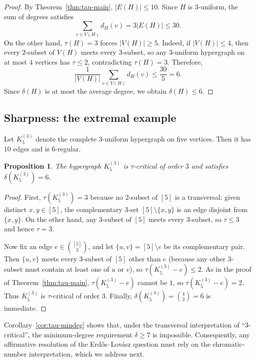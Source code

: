 \documentclass[11pt]{amsart}
\newtheorem{proposition}[theorem]{Proposition}
\theoremstyle{definition}
\theoremstyle{remark}
\newcommand{\V}{V}
\newcommand{\E}{E}
\newcommand{\del}{\delta}
\begin{document}
\begin{proof}
By Theorem~\ref{thm:tau-main}, $|\E(H)|\le 10$.
Since $H$ is $3$-uniform, the sum of degrees satisfies
\[
\sum_{v\in \V(H)} d_H(v)=3|\E(H)|\le 30.
\]
On the other hand, $\tau(H)=3$ forces $|\V(H)|\ge 5$.
Indeed, if $|\V(H)|\le 4$, then every $2$-subset of $\V(H)$ meets every $3$-subset, so any $3$-uniform hypergraph on at most $4$ vertices has $\tau\le 2$, contradicting $\tau(H)=3$.
Therefore,
\[
\frac{1}{|\V(H)|}\sum_{v\in \V(H)} d_H(v)\le \frac{30}{5}=6.
\]
Since $\del(H)$ is at most the average degree, we obtain $\del(H)\le 6$.
\end{proof}

\subsection{Sharpness: the extremal example}

Let $K^{(3)}_5$ denote the complete $3$-uniform hypergraph on five vertices.
Then it has $10$ edges and is $6$-regular.

\begin{proposition}\label{prop:K5tau}
The hypergraph $K^{(3)}_5$ is $\tau$-critical of order $3$ and satisfies $\del(K^{(3)}_5)=6$.
\end{proposition}

\begin{proof}
First, $\tau(K^{(3)}_5)=3$ because no $2$-subset of $[5]$ is a transversal: given distinct $x,y\in[5]$, the complementary $3$-set $[5]\setminus\{x,y\}$ is an edge disjoint from $\{x,y\}$.
On the other hand, any $3$-subset of $[5]$ meets every $3$-subset, so $\tau\le 3$ and hence $\tau=3$.

Now fix an edge $e\in \binom{[5]}{3}$, and let $\{u,v\}=[5]\setminus e$ be its complementary pair.
Then $\{u,v\}$ meets every $3$-subset of $[5]$ other than $e$ (because any other $3$-subset must contain at least one of $u$ or $v$), so $\tau(K^{(3)}_5-e)\le 2$.
As in the proof of Theorem~\ref{thm:tau-main}, $\tau(K^{(3)}_5-e)$ cannot be $1$, so $\tau(K^{(3)}_5-e)=2$.
Thus $K^{(3)}_5$ is $\tau$-critical of order $3$.
Finally, $\del(K^{(3)}_5)=\binom{4}{2}=6$ is immediate.
\end{proof}

Corollary~\ref{cor:tau-mindeg} shows that, under the transversal interpretation of ``$3$-critical'', the minimum-degree requirement $\del\ge 7$ is impossible.
Consequently, any affirmative resolution of the Erd\H{o}s--Lov\'asz question must rely on the chromatic-number interpretation, which we address next.
\end{document}
